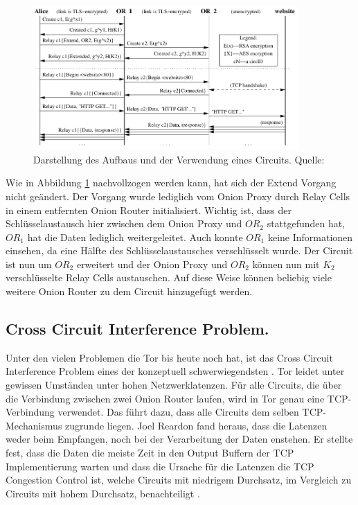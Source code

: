 \documentclass[fleqn,envcountsame,runningheads,10pt,a4paper]{llncs}
\begin{document}
\begin{figure}[t]
  \begin{center}
    \includegraphics[width=0.9\textwidth]{pics/construction.pdf}
    \caption{Darstellung des Aufbaus und der Verwendung eines Circuits. Quelle: \cite{tor}}
    \label{fig:construction} 
  \end{center} 
\end{figure}

\newpage


Wie in Abbildung \ref{fig:construction} nachvollzogen werden kann, hat sich der 
Extend Vorgang nicht geändert. Der Vorgang wurde lediglich vom Onion Proxy durch 
Relay Cells in einem entfernten Onion Router initialisiert. Wichtig ist, dass 
der Schlüsselaustausch hier zwischen dem Onion Proxy und $\textit{OR}_2$ 
stattgefunden hat, $\textit{OR}_1$ hat die Daten lediglich weitergeleitet. Auch 
konnte $\textit{OR}_1$ keine Informationen einsehen, da eine Hälfte des 
Schlüsselaustausches verschlüsselt wurde. Der Circuit ist nun um $\textit{OR}_2$ 
erweitert und der Onion Proxy und $\textit{OR}_2$ können nun mit $K_2$ 
verschlüsselte Relay Cells austauschen. Auf diese Weise können beliebig viele 
weitere Onion Router zu dem Circuit hinzugefügt werden.

\subsection{Cross Circuit Interference Problem.}
\label{sec:crosscircuitinterference} 

Unter den vielen Problemen die Tor bis heute noch hat, ist das Cross Circuit 
Interference Problem eines der konzeptuell schwerwiegendsten 
\cite{tor_improvements}. Tor leidet unter gewissen Umständen unter hohen 
Netzwerklatenzen. Für alle Circuits, die über die Verbindung zwischen zwei Onion 
Router laufen, wird in Tor genau eine TCP-Verbindung verwendet. Das führt dazu, 
dass alle Circuits dem selben TCP-Mechanismus zugrunde liegen. Joel Reardon fand 
heraus, dass die Latenzen weder beim Empfangen, noch bei der Verarbeitung der 
Daten enstehen. Er stellte fest, dass die Daten die meiste Zeit in den Output 
Buffern der TCP Implementierung warten und dass die Ursache für die Latenzen die 
TCP Congestion Control ist, welche Circuits mit niedrigem Durchsatz, im 
Vergleich zu Circuits mit hohem Durchsatz, benachteiligt 
\cite{tcp-over-dtls-thesis,tcp-over-dtls}.
\end{document}
